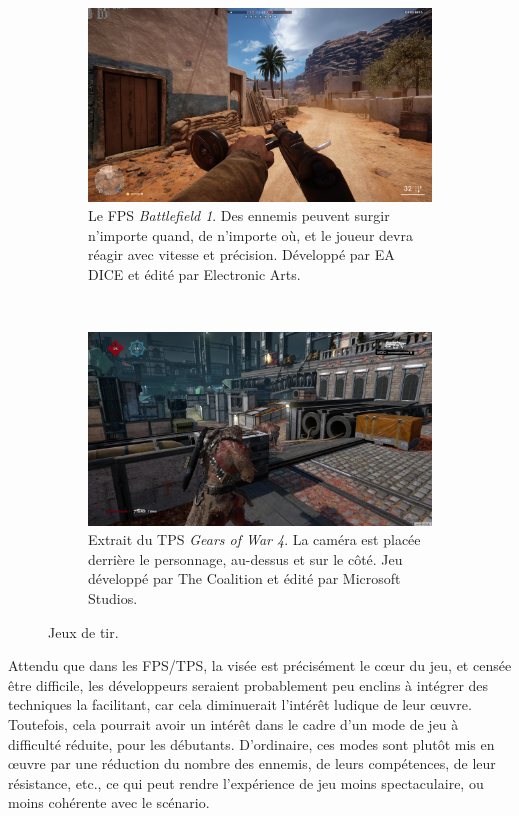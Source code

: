 	\begin{figure}[!htbp]
		\begin{subfigure}[t]{0.49\textwidth}
			\centering
			\includegraphics[width=\textwidth]{figures/ch1/bf1}
			\caption[Le FPS \emph{Battlefield 1}]{Le FPS \emph{Battlefield 1}. Des ennemis peuvent surgir n'importe quand, de n'importe où, et le joueur devra réagir avec vitesse et précision. Développé par EA DICE et édité par Electronic Arts.}
			\label{fig:bf1}
		\end{subfigure}
		~
		\begin{subfigure}[t]{0.49\textwidth}
			\centering
			\includegraphics[width=\textwidth]{figures/ch1/gears}
			\caption[Le TPS \emph{Gears of War 4}]{Extrait du TPS \emph{Gears of War 4}. La caméra est placée derrière le personnage, au-dessus et sur le côté. Jeu développé par The Coalition et édité par Microsoft Studios.}
			\label{fig:gears}
		\end{subfigure}
		\caption{Jeux de tir.}
		\label{fig:shooters}
	\end{figure}
	
	Attendu que dans les FPS/TPS, la visée est précisément le cœur du jeu, et censée être difficile, les développeurs seraient probablement peu enclins à intégrer des techniques la facilitant, car cela diminuerait l'intérêt ludique de leur œuvre. Toutefois, cela pourrait avoir un intérêt dans le cadre d'un mode de jeu à difficulté réduite, pour les débutants. D'ordinaire, ces modes sont plutôt mis en œuvre par une réduction du nombre des ennemis, de leurs compétences, de leur résistance, etc., ce qui peut rendre l'expérience de jeu moins spectaculaire, ou moins cohérente avec le scénario.
	
